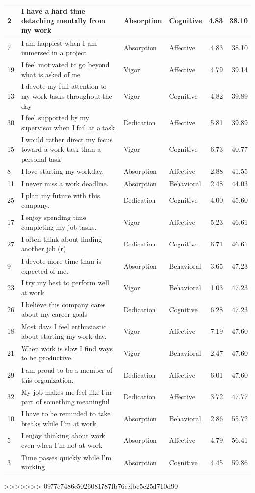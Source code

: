 \documentclass[
]{book}
\begin{document}
\begin{table}
\begin{tabular}[t]{l|l|l|l|r|r}
\hline
2 & I have a hard time detaching mentally from my work & Absorption & Cognitive & 4.83 & 38.10\\
\hline
7 & I am happiest when I am immersed in a project & Absorption & Affective & 4.83 & 38.10\\
\hline
19 & I feel motivated to go beyond what is asked of me & Vigor & Affective & 4.79 & 39.14\\
\hline
13 & I devote my full attention to my work tasks throughout the day & Vigor & Cognitive & 4.82 & 39.89\\
\hline
30 & I feel supported by my supervisor when I fail at a task & Dedication & Affective & 5.81 & 39.89\\
\hline
15 & I would rather direct my focus toward a work task than a personal task & Vigor & Cognitive & 6.73 & 40.77\\
\hline
8 & I love starting my workday. & Absorption & Affective & 2.88 & 41.55\\
\hline
11 & I never miss a work deadline. & Absorption & Behavioral & 2.48 & 44.03\\
\hline
25 & I plan my future with this company. & Dedication & Cognitive & 4.00 & 45.60\\
\hline
17 & I enjoy spending time completing my job tasks. & Vigor & Affective & 5.23 & 46.61\\
\hline
27 & I often think about finding another job (r) & Dedication & Cognitive & 6.71 & 46.61\\
\hline
9 & I devote more time than is expected of me. & Absorption & Behavioral & 3.65 & 47.23\\
\hline
23 & I try my best to perform well at work & Vigor & Behavioral & 1.03 & 47.23\\
\hline
26 & I believe this company cares about my career goals & Dedication & Cognitive & 6.28 & 47.23\\
\hline
18 & Most days I feel enthusiastic about starting my work day. & Vigor & Affective & 7.19 & 47.60\\
\hline
21 & When work is slow I find ways to be productive. & Vigor & Behavioral & 2.47 & 47.60\\
\hline
29 & I am proud to be a member of this organization. & Dedication & Affective & 6.01 & 47.60\\
\hline
32 & My job makes me feel like I’m part of something meaningful & Dedication & Affective & 3.72 & 47.77\\
\hline
10 & I have to be reminded to take breaks while I’m at work & Absorption & Behavioral & 2.86 & 55.72\\
\hline
5 & I enjoy thinking about work even when I’m not at work & Absorption & Affective & 4.79 & 56.41\\
\hline
3 & Time passes quickly while I’m working & Absorption & Cognitive & 4.45 & 59.86\\
\hline
\end{tabular}
\end{table}
>>>>>>> 0977e7486e5026081787fb76ccfbc5c25d710d90

  
\end{document}

